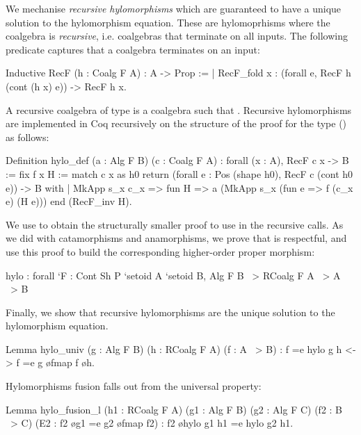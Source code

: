 \documentclass[ a4paper, UKenglish, cleveref, autoref, thm-restate]{lipics-v2021}
\begin{document}
We mechanise \emph{recursive
hylomorphisms} which are guaranteed to have a unique solution to the
hylomorphism equation. These are hylomoprhisms where the coalgebra is
\emph{recursive}, i.e. coalgebras that terminate on all inputs. The following
predicate captures that a coalgebra terminates on an input: 
\begin{coqcode}
Inductive RecF (h : Coalg F A) : A -> Prop :=
| RecF_fold x : (forall e, RecF h (cont (h x) e)) -> RecF h x.
\end{coqcode}
A recursive coalgebra of type  is a coalgebra 
 such that .
Recursive hylomorphisms are implemented in Coq recursively on the structure of
the proof for the type () as follows:
\begin{coqcode}
Definition hylo_def (a : Alg F B) (c : Coalg F A) 
  : forall (x : A), RecF c x -> B := fix f x H
  := match c x as h0 return (forall e : Pos (shape h0), RecF c (cont h0 e)) -> B
     with | MkApp s_x c_x => fun H => a (MkApp s_x (fun e => f (c_x e) (H e)))
     end (RecF_inv H).
\end{coqcode}
We use  to obtain the structurally smaller proof to use in
the recursive calls. As we did with catamorphisms and anamorphisms, we
prove that  is respectful, and use this proof to build the
corresponding higher-order proper morphism:
\begin{coqcode}
  hylo : forall `{F : Cont Sh P} `{setoid A} `{setoid B}, 
    Alg F B ~> RCoalg F A ~> A ~> B
\end{coqcode}
Finally, we show that recursive hylomorphisms are the unique solution to the
hylomorphism equation.
\begin{coqcode}
Lemma hylo_univ (g : Alg F B) (h : RCoalg F A) (f : A ~> B)
    : f =e hylo g h <-> f =e g \o fmap f \o h.
\end{coqcode}
Hylomorphisms fusion falls out from the universal property:
\begin{coqcode}
Lemma hylo_fusion_l (h1 : RCoalg F A) (g1 : Alg F B) (g2 : Alg F C)
  (f2 : B ~> C) (E2 : f2 \o g1 =e g2 \o fmap f2) : f2 \o hylo g1 h1 =e hylo g2 h1.
\end{coqcode}

\end{document}
